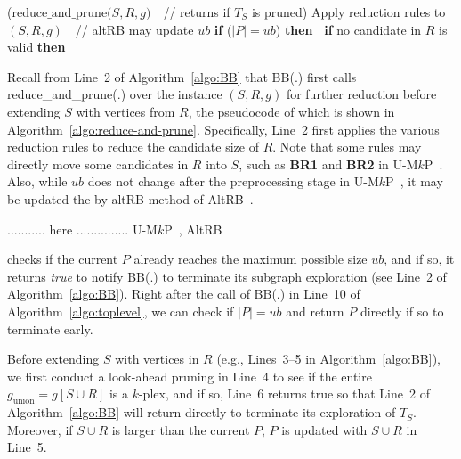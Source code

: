 \documentclass[sigconf,anonymous,review]{acmart}
\begin{document}
\begin{algorithm}[!t]
  \DontPrintSemicolon
  \Begin($\text{reduce\_and\_prune}{(}S, R, g{)}$\ \ // returns if $T_S$ is pruned){ %
  Apply reduction rules to $(S, R, g)$\ \ // altRB may update $ub$\;
  {\bf if} ($|P|=ub$) {\bf then\ } \;
  {\bf if} no candidate in $R$ is valid {\bf then\ } \;
}
\caption{Reduction and Pruning Function in AltRB}
\label{algo:reduce-and-prune}
\end{algorithm}
\setlength{\textfloatsep}{0pt}

\vspace{1mm}
 Recall from Line~2 of Algorithm~\ref{algo:BB} that BB(.) first calls reduce\_and\_prune(.) over the instance $(S,R, g)$ for further reduction before extending $S$ with vertices from $R$, the pseudocode of which is shown in Algorithm~\ref{algo:reduce-and-prune}. 
%
Specifically, Line~2 first applies the various reduction rules to reduce the candidate size of $R$. Note that some rules may directly move some candidates in $R$ into $S$, such as {\bf BR1} and {\bf BR2} in U-M$k$P~\cite{akhlaque_vldb}. Also, while $ub$ does not change after the preprocessing stage in U-M$k$P~\cite{akhlaque_vldb}, it may be updated the by altRB method of AltRB~\cite{clong_vldb}. %


........... here ............... U-M$k$P~\cite{akhlaque_vldb}, AltRB~\cite{clong_vldb}


checks if the current $P$ already reaches the maximum possible size $ub$, and if so, it returns {\em true} to notify BB(.) to terminate its subgraph exploration (see Line~2 of Algorithm~\ref{algo:BB}). 
Right after the call of BB(.) in Line~10 of Algorithm~\ref{algo:toplevel}, we can check if $|P|=ub$ and return $P$ directly if so to terminate early.

Before extending $S$ with vertices in $R$ (e.g., Lines~3--5 in Algorithm~\ref{algo:BB}), we first conduct a look-ahead pruning in Line~4 to see if the entire $g_\text{union}=g[S\cup R]$ is a $k$-plex, and if so, Line~6 returns true so that Line~2 of Algorithm~\ref{algo:BB} will return directly to terminate its exploration of $T_S$. Moreover, if $S\cup R$ is larger than the current $P$, $P$ is updated with $S\cup R$ in Line~5.
\end{document}
